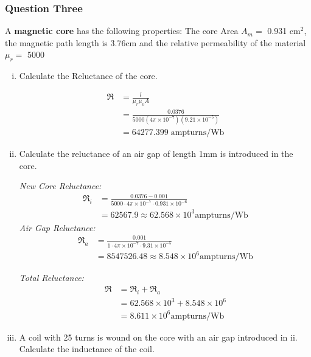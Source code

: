 \documentclass[a4paper,11pt]{article}
\begin{document}
\newpage
\subsubsection*{Question Three}
A \textbf{magnetic core} has the following properties: The core Area $A_m = $ 0.931 cm$^2$, the magnetic path length is 3.76cm and the relative permeability of the material $\mu_r = $ 5000

\begin{enumerate}[i.]
    \item Calculate the Reluctance of the core.

          \begin{align*}
              \mathfrak{R} & = \frac{l}{\mu_{r}\mu_{0}A}                                             \\
                           & = \frac{0.0376}{5000(4\pi\times10^{-7})(9.21\times10^{-5})} \\
                           & = 64277.399 \; \mathrm{ampturns/Wb}
          \end{align*}

    \item Calculate the reluctance of an air gap of length 1mm is introduced in the core.

        \textit{New Core Reluctance:}
        \begin{align*}
            \mathfrak{R}_i &= \frac{0.0376 - 0.001}{5000\cdot 4\pi\times10^{-7}\cdot 0.931\times 10^{-6}} \\ 
            &= 62567.9 \approx 62.568\times 10^3 \mathrm{ampturns/Wb}
        \end{align*}
          \textit{Air Gap Reluctance:}
          \begin{align*}
            \mathfrak{R}_a &= \frac{0.001}{1\cdot 4\pi\times10^{-7}\cdot 9.31\times 10^{-5}}\\
             &= 8547526.48 \approx 8.548\times 10^6 \mathrm{ampturns/Wb}
          \end{align*}

          \textit{Total Reluctance:}
          \begin{align*}
            \mathfrak{R} &= \mathfrak{R}_i + \mathfrak{R}_a\\ 
            &= 62.568\times 10^3 + 8.548\times 10^6\\
            &= 8.611\times 10^6 \mathrm{ampturns/Wb}
          \end{align*}

    \item A coil with 25 turns is wound on the core with an air gap introduced in ii. Calculate the inductance of the coil.


\end{enumerate}
\end{document}

